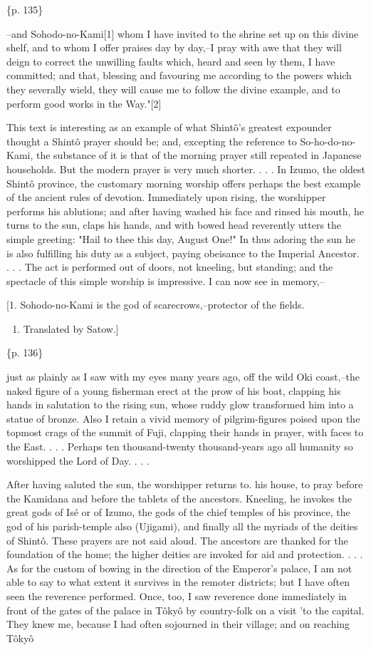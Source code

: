 \{p. 135\}

--and Sohodo-no-Kami[1] whom I have invited to the shrine set up on this divine shelf, and to whom I offer praises day by day,--I pray with awe that they will deign to correct the unwilling faults which, heard and seen by them, I have committed; and that, blessing and favouring me according to the powers which they severally wield, they will cause me to follow the divine example, and to perform good works in the Way."[2]

This text is interesting as an example of what Shintô's greatest expounder thought a Shintô prayer should be; and, excepting the reference to So-ho-do-no-Kami, the substance of it is that of the morning prayer still repeated in Japanese households. But the modern prayer is very much shorter. . . . In Izumo, the oldest Shintô province, the customary morning worship offers perhaps the best example of the ancient rules of devotion. Immediately upon rising, the worshipper performs his ablutions; and after having washed his face and rinsed his mouth, he turns to the sun, claps his hands, and with bowed head reverently utters the simple greeting: "Hail to thee this day, August One!" In thus adoring the sun he is also fulfilling his duty as a subject, paying obeisance to the Imperial Ancestor. . . . The act is performed out of doors, not kneeling, but standing; and the spectacle of this simple worship is impressive. I can now see in memory,--

[1. Sohodo-no-Kami is the god of scarecrows,--protector of the fields.

\begin{enumerate}
\item Translated by Satow.]
\end{enumerate}

\{p. 136\}

just as plainly as I saw with my eyes many years ago, off the wild Oki coast,--the naked figure of a young fisherman erect at the prow of his boat, clapping his hands in salutation to the rising sun, whose ruddy glow transformed him into a statue of bronze. Also I retain a vivid memory of pilgrim-figures poised upon the topmost crags of the summit of Fuji, clapping their hands in prayer, with faces to the East. . . . Perhaps ten thousand-twenty thousand-years ago all humanity so worshipped the Lord of Day. . . .

After having saluted the sun, the worshipper returns to. his house, to pray before the Kamidana and before the tablets of the ancestors. Kneeling, he invokes the great gods of Isé or of Izumo, the gods of the chief temples of his province, the god of his parish-temple also (Ujigami), and finally all the myriads of the deities of Shintô. These prayers are not said aloud. The ancestors are thanked for the foundation of the home; the higher deities are invoked for aid and protection. . . . As for the custom of bowing in the direction of the Emperor's palace, I am not able to say to what extent it survives in the remoter districts; but I have often seen the reverence performed. Once, too, I saw reverence done immediately in front of the gates of the palace in Tôkyô by country-folk on a visit 'to the capital. They knew me, because I had often sojourned in their village; and on reaching Tôkyô

